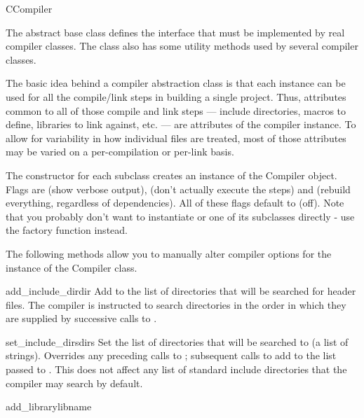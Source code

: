 \documentclass{manual}
\begin{document}
\begin{classdesc}{CCompiler}{}

The abstract base class  defines the interface that 
must be implemented by real compiler classes.  The class also has 
some utility methods used by several compiler classes.

The basic idea behind a compiler abstraction class is that each
instance can be used for all the compile/link steps in building a
single project.  Thus, attributes common to all of those compile and
link steps --- include directories, macros to define, libraries to link
against, etc. --- are attributes of the compiler instance.  To allow for
variability in how individual files are treated, most of those
attributes may be varied on a per-compilation or per-link basis.

The constructor for each subclass creates an instance of the Compiler
object. Flags are  (show verbose output), 
(don't actually execute the steps) and  (rebuild
everything, regardless of dependencies). All of these flags default to
 (off). Note that you probably don't want to instantiate
 or one of its subclasses directly - use the
 factory function
instead.

The following methods allow you to manually alter compiler options for 
the instance of the Compiler class.

\begin{methoddesc}{add_include_dir}{dir}
Add  to the list of directories that will be searched for
header files.  The compiler is instructed to search directories in
the order in which they are supplied by successive calls to
.
\end{methoddesc}

\begin{methoddesc}{set_include_dirs}{dirs}
Set the list of directories that will be searched to  (a
list of strings).  Overrides any preceding calls to
; subsequent calls to
 add to the list passed to
.  This does not affect any list of
standard include directories that the compiler may search by default.
\end{methoddesc}

\begin{methoddesc}{add_library}{libname}


\end{methoddesc}
\end{classdesc}
\end{document}
